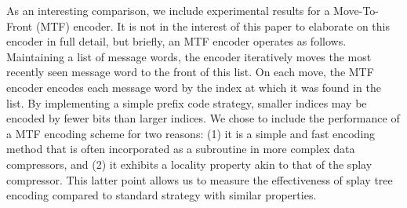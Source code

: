 \documentclass[twoside]{article}
\begin{document}
\begin{multicols}{2}
As an interesting comparison, we include experimental results for a Move-To-Front (MTF) encoder. It is not in the interest of this paper to elaborate on this encoder in full detail, but briefly, an MTF encoder operates as follows. Maintaining a list of message words, the encoder iteratively moves the most recently seen message word to the front of this list. On each move, the MTF encoder encodes each message word by the index at which it was found in the list. By implementing a simple prefix code strategy, smaller indices may be encoded by fewer bits than larger indices. We chose to include the performance of a MTF encoding scheme for two reasons: (1) it is a simple and fast encoding method that is often incorporated as a subroutine in more complex data compressors, and (2) it exhibits a locality property akin to that of the splay compressor. This latter point allows us to measure the effectiveness of splay tree encoding compared to standard strategy with similar properties.


\end{multicols}
\end{document}

